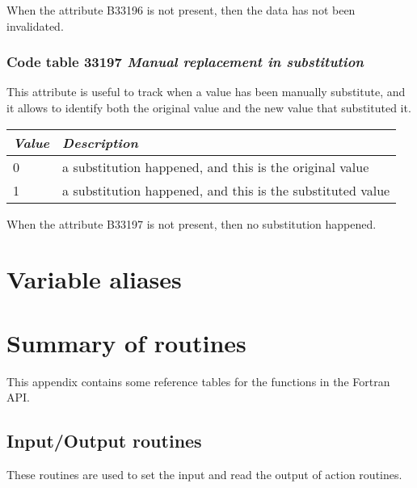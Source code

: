 \documentclass[final,12pt,a4paper,twoside]{book}
\begin{document}
When the attribute B33196 is not present, then the data has not been
invalidated.

\subsection{Code table 33197 \emph{Manual replacement in substitution}}

This attribute is useful to track when a value has been manually substitute,
and it allows to identify both the original value and the new value that
substituted it.

\begin{tabular}{|l|l|}
\hline
{\em Value} & {\em Description}               \\
\hline
          0 & a substitution happened, and this is the original value    \\
          1 & a substitution happened, and this is the substituted value \\
\hline
\end{tabular}

When the attribute B33197 is not present, then no substitution happened.


\chapter{Variable aliases}

\label{aliastable}



\chapter{Summary of routines}

This appendix contains some reference tables for the functions in the Fortran
API.

\section{Input/Output routines}

These routines are used to set the input and read the output of action routines.
\end{document}

